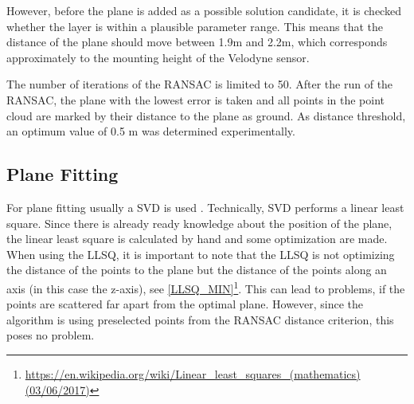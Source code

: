 \documentclass[11pt,oneside,openright]{mpreport}
\begin{document}
However, before the plane is added as a possible solution candidate, it is checked whether the layer is within a plausible parameter range.
This means that the distance of the plane should move between 1.9m and 2.2m, which corresponds approximately to the mounting height of the Velodyne sensor.

The number of iterations of the \ac{RANSAC} is limited to 50. After the run of the \ac{RANSAC}, the plane with the lowest error is taken and all points in the
point cloud are marked by their distance to the plane as ground. As distance threshold, an optimum value of 0.5 m was determined experimentally.


\subsection{Plane Fitting}
\label{subssec:planefitting}



For plane fitting usually a \ac{SVD} is used \cite{Nurunnabi2012,Ram2007,Soderkvist2009}. Technically, SVD performs a linear least square\cite{Lee2012}.
Since there is already ready knowledge about the position of the plane, the linear least square is calculated by hand and some optimization are made.
When using the \ac{LLSQ}, it is important to note that the \ac{LLSQ} is not optimizing the distance of the points to the plane but the distance of the points along an axis (in this case the z-axis),
see \cref{LLSQ_MIN}\footnote{\url{https://en.wikipedia.org/wiki/Linear_least_squares_(mathematics) (03/06/2017)}}. This can lead to problems, if the points are scattered far apart from the optimal plane.
However, since the algorithm is using preselected points from the \ac{RANSAC} distance criterion, this poses no problem.
\end{document}

